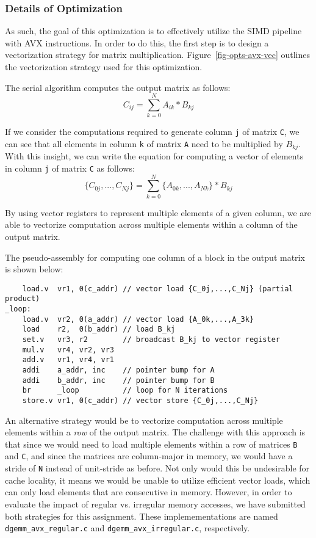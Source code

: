 \subsubsection{Details of Optimization}


As such, the goal of this optimization is to effectively utilize the SIMD
pipeline with AVX instructions. In order to do this, the first step is to
design a vectorization strategy for matrix
multiplication. Figure~\ref{fig-opts-avx-vec} outlines the
vectorization strategy used for this optimization.
\smallskip

The serial algorithm computes the output matrix as follows:
\[
C_{ij} = \sum_{k=0}^{N}A_{ik}*B_{kj}
\]
\smallskip

If we consider the computations required to generate column {\tt{j}} of
matrix {\tt{C}}, we can see that all elements in column {\tt{k}} of matrix
{\tt{A}} need to be multiplied by $B_{kj}$. With this insight, we can
write the equation for computing a vector of elements in column {\tt{j}} of
matrix {\tt{C}} as follows:
\[
\{C_{0j},...,C_{Nj}\} = \sum_{k=0}^{N}\{A_{0k},...,A_{Nk}\}*B_{kj}
\]
\smallskip

By using vector registers to represent multiple elements of a given
column, we are able to vectorize computation across multiple elements
within a column of the output matrix.
\smallskip

The pseudo-assembly for computing one column of a block in the output
matrix is shown below:
\smallskip

\begin{verbatim}
    load.v  vr1, 0(c_addr) // vector load {C_0j,...,C_Nj} (partial product)
_loop:
    load.v  vr2, 0(a_addr) // vector load {A_0k,...,A_3k}
    load    r2,  0(b_addr) // load B_kj
    set.v   vr3, r2        // broadcast B_kj to vector register
    mul.v   vr4, vr2, vr3
    add.v   vr1, vr4, vr1
    addi    a_addr, inc    // pointer bump for A
    addi    b_addr, inc    // pointer bump for B
    br      _loop          // loop for N iterations
    store.v vr1, 0(c_addr) // vector store {C_0j,...,C_Nj}
\end{verbatim}
\smallskip

An alternative strategy would be to vectorize computation across
multiple elements within a \emph{row} of the output matrix. The challenge
with this approach is that since we would need to load multiple elements
within a row of matrices {\tt{B}} and {\tt{C}}, and since the matrices
are column-major in memory, we would have a stride of {\tt{N}} instead of
unit-stride as before. Not only would this be undesirable for cache
locality, it means we would be unable to utilize efficient vector loads,
which can only load elements that are consecutive in memory. However, in
order to evaluate the impact of regular vs. irregular memory accesses, we
have submitted both strategies for this assignment. These
implemementations are named {\tt{dgemm\_avx\_regular.c}} and
{\tt{dgemm\_avx\_irregular.c}}, respectively.
\smallskip

